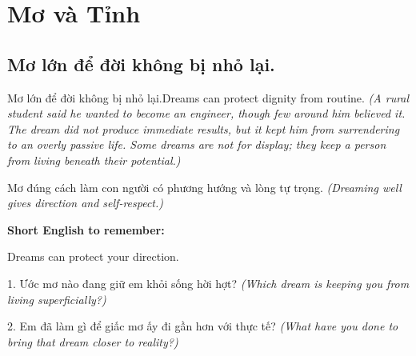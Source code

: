 \chapter{Mơ và Tỉnh}

\section{Mơ lớn để đời không bị nhỏ lại.}
\begin{truyen}{Mơ lớn để đời không bị nhỏ lại.}{Dreams can protect dignity from routine.}
\textit{(A rural student said he wanted to become an engineer, though few around him believed it. The dream did not produce immediate results, but it kept him from surrendering to an overly passive life. Some dreams are not for display; they keep a person from living beneath their potential.)}
\end{truyen}
\begin{baihoc}
Mơ đúng cách làm con người có phương hướng và lòng tự trọng.
\textit{(Dreaming well gives direction and self-respect.)}
\end{baihoc}
\begin{ghinhoanh}
\textbf{Short English to remember:}

Dreams can protect your direction.
\end{ghinhoanh}
\begin{tuhocnhanh}
1. Ước mơ nào đang giữ em khỏi sống hời hợt? \textit{(Which dream is keeping you from living superficially?)}

2. Em đã làm gì để giấc mơ ấy đi gần hơn với thực tế? \textit{(What have you done to bring that dream closer to reality?)}
\end{tuhocnhanh}
\ngancach

